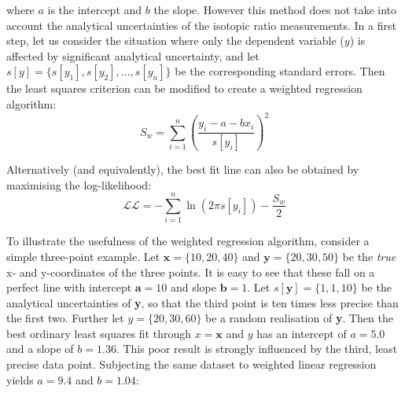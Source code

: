 \begin{refsection}
\noindent where $a$ is the intercept and $b$ the slope. However this
method does not take into account the analytical uncertainties of the
isotopic ratio measurements. In a first step, let us consider the
situation where only the dependent variable ($y$) is affected by
significant analytical uncertainty, and let $s[y] =
\{s[y_1],s[y_2],\ldots,s[y_n]\}$ be the corresponding standard
errors. Then the least squares criterion can be modified to create a
weighted regression algorithm:
\begin{equation}
  S_w = \sum\limits_{i=1}^{n}\left( \frac{y_i - a - b x_i}{s[y_i]} \right)^2
  \label{eq:Swtd}
\end{equation}

Alternatively (and equivalently), the best fit line can also be
obtained by maximising the log-likelihood:
\begin{equation}
  \mathcal{LL} = - \sum\limits_{i=1}^{n} \ln\left(2 \pi s[y_i] \right)
  - \frac{S_w}{2}
  \label{eq:L}
\end{equation}

To illustrate the usefulness of the weighted regression algorithm,
consider a simple three-point example. Let $\boldsymbol{x} = \{10, 20,
40\}$ and $\boldsymbol{y} = \{20,30,50\}$ be the \emph{true} x- and
y-coordinates of the three points. It is easy to see that these fall
on a perfect line with intercept $\boldsymbol{a} = 10$ and slope
$\boldsymbol{b} = 1$. Let $s[\boldsymbol{y}] = \{1,1,10\}$ be the
analytical uncertainties of \textbf{y}, so that the third point is ten
times less precise than the first two. Further let $y = \{20,30,60\}$
be a random realisation of \textbf{y}.  Then the best ordinary least
squares fit through $x = \boldsymbol{x}$ and $y$ has an intercept of
$a = 5.0$ and a slope of $b = 1.36$. This poor result is strongly
influenced by the third, least precise data point. Subjecting the same
dataset to weighted linear regression yields $a = 9.4$ and $b =
1.04$:\\


\end{refsection}
